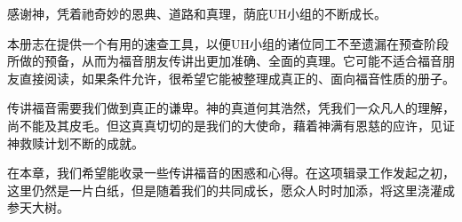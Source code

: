 \documentclass[Chinese]{CKBib}
\begin{document}

感谢神，凭着祂奇妙的恩典、道路和真理，荫庇UH小组的不断成长。

本册志在提供一个有用的速查工具，以便UH小组的诸位同工不至遗漏在预查阶段所做的预备，从而为福音朋友传讲出更加准确、全面的真理。它可能不适合福音朋友直接阅读，如果条件允许，很希望它能被整理成真正的、面向福音性质的册子。

传讲福音需要我们做到真正的谦卑。神的真道何其浩然，凭我们一众凡人的理解，尚不能及其皮毛。但这真真切切的是我们的大使命，藉着神满有恩慈的应许，见证神救赎计划不断的成就。

在本章，我们希望能收录一些传讲福音的困惑和心得。在这项辑录工作发起之初，这里仍然是一片白纸，但是随着我们的共同成长，愿众人时时加添，将这里浇灌成参天大树。

\cleardoublepage

\end{document}
